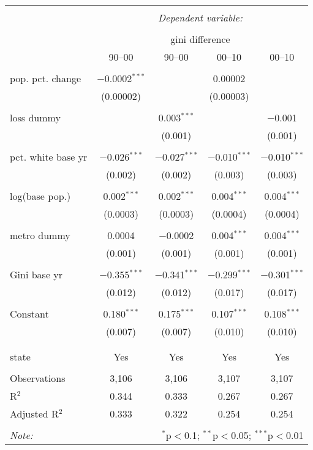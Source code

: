 \documentclass{standalone}
\begin{document}
\begin{tabular}{@{\extracolsep{5pt}}lcccc} 
\\[-1.8ex]\hline 
\hline \\[-1.8ex] 
 & \multicolumn{4}{c}{\textit{Dependent variable:}} \\ 
\cline{2-5} 
\\[-1.8ex] & \multicolumn{4}{c}{gini difference} \\ 
 & 90--00 & 90--00 & 00--10 & 00--10 \\ 
\hline \\[-1.8ex] 
 pop. pct. change & $-$0.0002$^{***}$ &  & 0.00002 &  \\ 
  & (0.00002) &  & (0.00003) &  \\ 
  & & & & \\ 
 loss dummy &  & 0.003$^{***}$ &  & $-$0.001 \\ 
  &  & (0.001) &  & (0.001) \\ 
  & & & & \\ 
 pct. white base yr & $-$0.026$^{***}$ & $-$0.027$^{***}$ & $-$0.010$^{***}$ & $-$0.010$^{***}$ \\ 
  & (0.002) & (0.002) & (0.003) & (0.003) \\ 
  & & & & \\ 
 log(base pop.) & 0.002$^{***}$ & 0.002$^{***}$ & 0.004$^{***}$ & 0.004$^{***}$ \\ 
  & (0.0003) & (0.0003) & (0.0004) & (0.0004) \\ 
  & & & & \\ 
 metro dummy & 0.0004 & $-$0.0002 & 0.004$^{***}$ & 0.004$^{***}$ \\ 
  & (0.001) & (0.001) & (0.001) & (0.001) \\ 
  & & & & \\ 
 Gini base yr & $-$0.355$^{***}$ & $-$0.341$^{***}$ & $-$0.299$^{***}$ & $-$0.301$^{***}$ \\ 
  & (0.012) & (0.012) & (0.017) & (0.017) \\ 
  & & & & \\ 
 Constant & 0.180$^{***}$ & 0.175$^{***}$ & 0.107$^{***}$ & 0.108$^{***}$ \\ 
  & (0.007) & (0.007) & (0.010) & (0.010) \\ 
  & & & & \\ 
\hline \\[-1.8ex] 
state & Yes & Yes & Yes & Yes \\ 
\hline \\[-1.8ex] 
Observations & 3,106 & 3,106 & 3,107 & 3,107 \\ 
R$^{2}$ & 0.344 & 0.333 & 0.267 & 0.267 \\ 
Adjusted R$^{2}$ & 0.333 & 0.322 & 0.254 & 0.254 \\ 
\hline 
\hline \\[-1.8ex] 
\textit{Note:}  & \multicolumn{4}{r}{$^{*}$p$<$0.1; $^{**}$p$<$0.05; $^{***}$p$<$0.01} \\ 
\end{tabular} 
\end{document}
